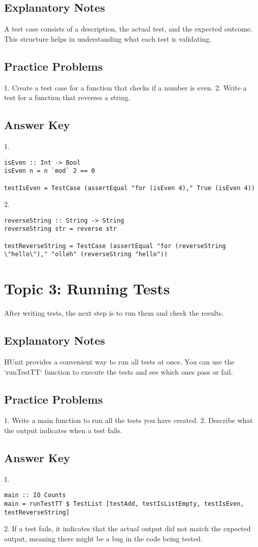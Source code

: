 \documentclass{article}
\begin{document}
\subsection*{Explanatory Notes}
A test case consists of a description, the actual test, and the expected outcome. This structure helps in understanding what each test is validating.

\subsection*{Practice Problems}
1. Create a test case for a function that checks if a number is even.
2. Write a test for a function that reverses a string.

\subsection*{Answer Key}
1. 
\begin{verbatim}
isEven :: Int -> Bool
isEven n = n `mod` 2 == 0

testIsEven = TestCase (assertEqual "for (isEven 4)," True (isEven 4))
\end{verbatim}

2. 
\begin{verbatim}
reverseString :: String -> String
reverseString str = reverse str

testReverseString = TestCase (assertEqual "for (reverseString \"hello\")," "olleh" (reverseString "hello"))
\end{verbatim}

\section*{Topic 3: Running Tests}
After writing tests, the next step is to run them and check the results.

\subsection*{Explanatory Notes}
HUnit provides a convenient way to run all tests at once. You can use the `runTestTT` function to execute the tests and see which ones pass or fail.

\subsection*{Practice Problems}
1. Write a main function to run all the tests you have created.
2. Describe what the output indicates when a test fails.

\subsection*{Answer Key}
1. 
\begin{verbatim}
main :: IO Counts
main = runTestTT $ TestList [testAdd, testIsListEmpty, testIsEven, testReverseString]
\end{verbatim}

2. If a test fails, it indicates that the actual output did not match the expected output, meaning there might be a bug in the code being tested.
\end{document}
